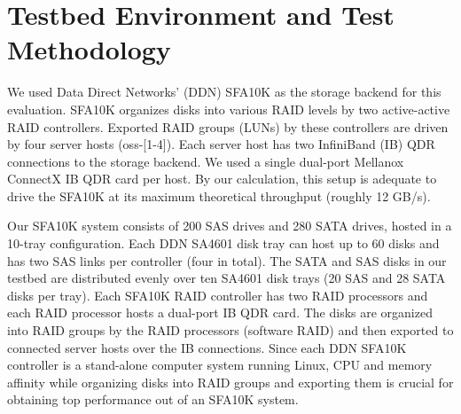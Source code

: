 \section{Testbed Environment and Test Methodology}
\label{sec:testbed}

We used Data Direct Networks' (DDN) SFA10K as the storage backend for this
evaluation. SFA10K organizes disks into various RAID levels by two
active-active RAID controllers. Exported RAID groups (LUNs) by these
controllers are driven by four server hosts (oss-[1-4]).  Each server host has
two InfiniBand (IB) QDR connections to the storage backend.  We used a single
dual-port Mellanox ConnectX IB QDR card per host.  By our calculation, this
setup is adequate to drive the SFA10K at its maximum theoretical throughput
(roughly 12 GB/s). 

Our SFA10K system consists of 200 SAS drives and 280 SATA drives, hosted in a
10-tray configuration. Each DDN SA4601 disk tray can host up to 60 disks and
has two SAS links per controller (four in total). The SATA and SAS disks in our
testbed are distributed evenly over ten SA4601 disk trays (20 SAS and 28 SATA
disks per tray). Each SFA10K RAID controller has two RAID processors and each
RAID processor hosts a dual-port IB QDR card. The disks are organized into RAID
groups by the RAID processors (software RAID) and then exported to connected
server hosts over the IB connections. Since each DDN SFA10K controller is a
stand-alone computer system running Linux, CPU and memory affinity while
organizing disks into RAID groups and exporting them is crucial for obtaining
top performance out of an SFA10K system.  

